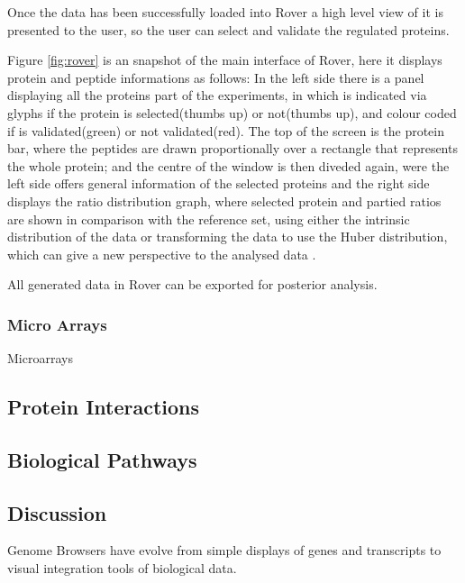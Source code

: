 Once the data has been successfully loaded into Rover a high level view of it is presented to the user, so the user can select and validate the regulated proteins. 

Figure \ref{fig:rover} is an snapshot of the main interface of Rover, here it displays protein and peptide informations as follows: In the left side there is a panel displaying all the proteins part of the experiments, in which is indicated via glyphs if the protein is selected(thumbs up) or not(thumbs up), and colour coded if is validated(green) or not validated(red). The top of the screen is the protein bar, where the peptides are drawn proportionally over a rectangle that represents the whole protein; and the centre of the window is then diveded again, were the left side offers general information of the selected proteins and the right side displays the ratio distribution graph, where selected protein and partied ratios are shown in comparison with the reference set, using either the intrinsic distribution of the data or transforming the data to use the Huber distribution, which can give a new perspective to the analysed data \cite{COL2010}.

All generated data in Rover can be exported for posterior analysis.

\subsubsection{Micro Arrays}

Microarrays

\subsection{Protein Interactions}
\subsection{Biological Pathways}

\subsection{Discussion}
Genome Browsers have evolve from simple displays of genes and transcripts to visual integration tools of biological data.

